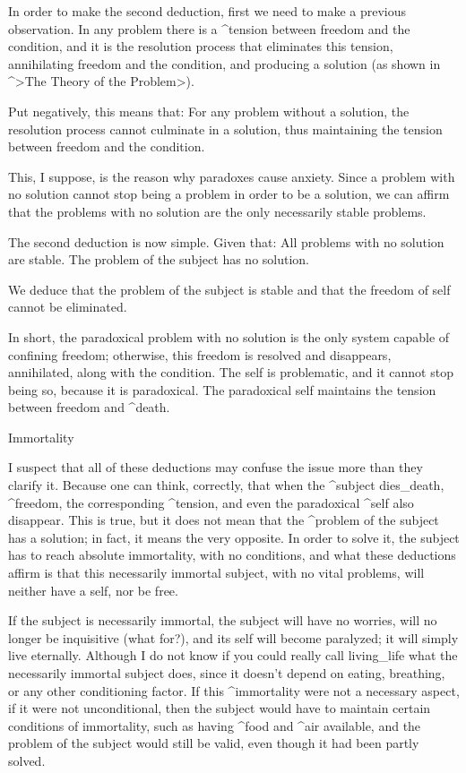 In order to make the second deduction, first we need to make a previous
observation.
\point In any problem there is a ^{tension} between freedom and the
condition, and it is the resolution process that eliminates this
tension, annihilating freedom and the condition, and producing a
solution (as shown in ^>The Theory of the Problem>).
\par\noindent Put negatively, this means that:
\point For any problem without a solution, the resolution process cannot
culminate in a solution, thus maintaining the tension between freedom
and the condition.
\par\noindent This, I suppose, is the reason why paradoxes cause anxiety.
Since a problem with no solution cannot stop being a problem in order to
be a solution, we can affirm that the problems with no solution are the
only necessarily stable problems.

The second deduction is now simple. Given that:
\point All problems with no solution are stable.
\point The problem of the subject has no solution.
\par\noindent We deduce that the problem of the subject is stable and that
the freedom of self cannot be eliminated.

In short, the paradoxical problem with no solution is the only system
capable of confining freedom; otherwise, this freedom is resolved and
disappears, annihilated, along with the condition. The self is
problematic, and it cannot stop being so, because it is paradoxical. The
paradoxical self maintains the tension between freedom and ^{death}.


\Section Immortality

I suspect that all of these deductions may confuse the issue more than
they clarify it. Because one can think, correctly, that when the
^{subject} dies_{death}, ^{freedom}, the corresponding ^{tension}, and
even the paradoxical ^{self} also disappear. This is true, but it does
not mean that the ^{problem of the subject} has a solution; in fact, it
means the very opposite. In order to solve it, the subject has to reach
absolute immortality, with no conditions, and what these deductions
affirm is that this necessarily immortal subject, with no vital
problems, will neither have a self, nor be free.

If the subject is necessarily immortal, the subject will have no
worries, will no longer be inquisitive (what for?), and its self will
become paralyzed; it will simply live eternally. Although I do not know
if you could really call living_{life} what the necessarily immortal
subject does, since it doesn't depend on eating, breathing, or any other
conditioning factor. If this ^{immortality} were not a necessary aspect,
if it were not unconditional, then the subject would have to maintain
certain conditions of immortality, such as having ^{food} and ^{air}
available, and the problem of the subject would still be valid, even
though it had been partly solved.


